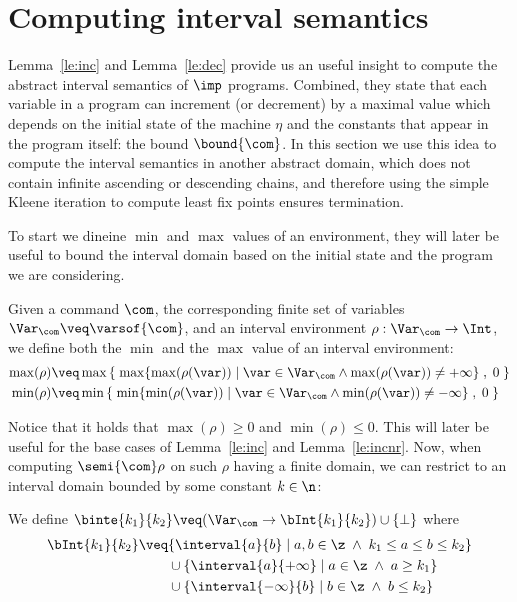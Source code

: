 \section{Computing interval semantics}\label{sec:computingint}

Lemma~\ref{le:inc} and Lemma~\ref{le:dec} provide us an useful insight
to compute the abstract interval semantics of \(\imp\)
programs. Combined, they state that each variable in a program can
increment (or decrement) by a maximal value which depends on the
initial state of the machine \(\eta\) and the constants that appear in
the program itself: the bound \(\bound{\com}\). In this section we use
this idea to compute the interval semantics in another abstract
domain, which does not contain infinite ascending or descending
chains, and therefore using the simple Kleene iteration to compute
least fix points ensures termination.

To start we dineine \(\min\) and \(\max\) values of an environment,
they will later be useful to bound the interval domain based on the
initial state and the program we are considering.

\begin{definition}\label{def:minmax}
  Given a command \(\com\), the corresponding finite set of variables
  \(\Var_{\com} \veq \varsof{\com}\), and an interval environment
  \(\rho : \Var_{\com} \to \Int\), we define both the \(\min\) and the
  \(\max\) value of an interval environment:
  \begin{align*}
    \max(\rho) & \veq \max\left\{\; \max \{ \max(\rho(\var)) \mid \var \in \Var_{\com} \land \max(\rho(\var)) \neq + \infty\} \; , \; 0 \; \right\} \\
    \min(\rho) & \veq \min\left\{\; \min \{ \min(\rho(\var)) \mid \var \in \Var_{\com} \land \min(\rho(\var)) \neq - \infty\} \; , \; 0 \; \right\}
  \end{align*}
\end{definition}
% 
Notice that it holds that \(\max(\rho) \geq 0\) and
\(\min(\rho) \leq 0\). This will later be useful for the base cases of
Lemma~\ref{le:inc} and Lemma~\ref{le:incnr}.  Now, when computing
\(\semi{\com} \rho\) on such \(\rho\) having a finite domain,
we can restrict to an interval domain bounded by some constant
\(k\in\n\):

\begin{definition}\label{def:boundedint}
  We define
  \(\binte{k_1}{k_2} \veq (\Var_{\com} \to \bInt{k_1}{k_2}) \cup
  \{\bot\}\) where
  \begin{align*}
    \bInt{k_1}{k_2} & \veq \{ \interval{a}{b} \mid a, b \in \z \; \land \; k_1 \leq a \leq b \leq k_2\} \\
                    & \phantom{\veq} \cup \{\interval{a}{+\infty} \mid a \in \z \; \land \; a \geq k_1\} \\
                    & \phantom{\veq} \cup \{\interval{-\infty}{b} \mid b \in \z \; \land \; b \leq k_2\}
  \end{align*}
\end{definition}

